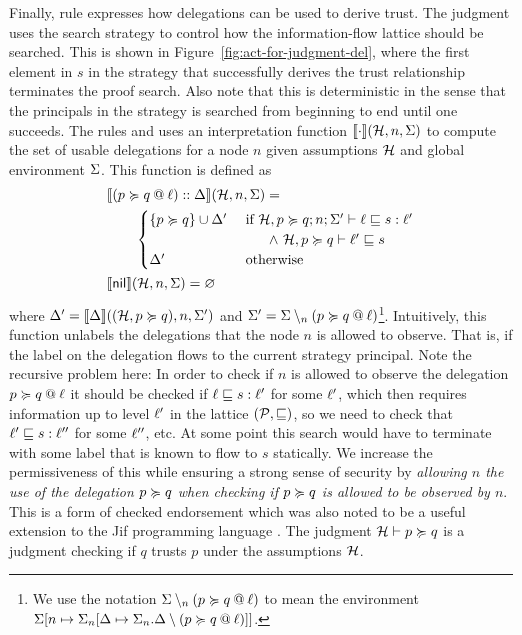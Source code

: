 Finally, rule  expresses how delegations can be used to derive trust. The judgment uses the search strategy to control how the information-flow lattice should be searched. This is shown in Figure~\ref{fig:act-for-judgment-del}, where the first element in $s$ in the strategy that successfully derives the trust relationship terminates the proof search. Also note that this is deterministic in the sense that the principals in the strategy is searched from beginning to end until one succeeds. The rules  and  uses an interpretation function $\llbracket \cdot \rrbracket(\mathcal{H}, n, \Sigma)$ to compute the set of usable delegations for a node $n$ given assumptions $\mathcal{H}$ and global environment $\Sigma$. This function is defined as
\begin{align}\label{eq:interpret-del}
&\llbracket (\lb{\level}{p \actsfor q}) :: \scope \rrbracket(\Assumps, n, \env) = \\ \nonumber &\qquad  \begin{cases}
\{ p \actsfor q \} \cup \scope' & \text{ if } \flowstoquery{\Assumps, p \actsfor q; n; \env'}{\level}{s}{\level'} \\ &\qquad \wedge\ \nopostflowstoquery{\Assumps, p \actsfor q}{\level'}{s} \\
\scope' & \text{ otherwise}
\end{cases}
\\ \nonumber
&\llbracket \nil \rrbracket(\Assumps, n, \env) = \varnothing
\end{align}
where $\Delta' = \llbracket \Delta \rrbracket((\mathcal{H}, p \succcurlyeq q), n, \Sigma')$ and $\Sigma' = \Sigma \setminus_n (p \succcurlyeq q \mathbin{@} \ell)$\footnote{We use the notation $\Sigma \setminus_n (p \succcurlyeq q \mathbin{@} \ell)$ to mean the environment $\Sigma \lbrack n \mapsto \Sigma_n \lbrack \Delta \mapsto \Sigma_n.\Delta \setminus (p \succcurlyeq q \mathbin{@} \ell) \rbrack \rbrack$.}. Intuitively, this function unlabels the delegations that the node $n$ is allowed to observe. That is, if the label on the delegation flows to the current strategy principal. Note the recursive problem here: In order to check if $n$ is allowed to observe the delegation $p \succcurlyeq q \mathbin{@} \ell$ it should be checked if $\ell \sqsubseteq s : \ell'$ for some $\ell'$, which then requires information up to level $\ell'$ in the lattice $(\mathcal{P}, \sqsubseteq)$, so we need to check that $\ell' \sqsubseteq s : \ell''$ for some $\ell''$, etc. At some point this search would have to terminate with some label that is known to flow to $s$ statically. We increase the permissiveness of this while ensuring a strong sense of security by \emph{allowing $n$ the use of the delegation $p \succcurlyeq q$ when checking if $p \succcurlyeq q$ is allowed to be observed by $n$}. This is a form of checked endorsement \cite{DBLP:journals/corr/abs-1107-5594} which was also noted to be a useful extension to the Jif programming language \cite{Chong:2007:SWA:1294261.1294265}. The judgment $\mathcal{H} \vdash p \succcurlyeq q$ is a judgment checking if $q$ trusts $p$ under the assumptions $\mathcal{H}$.

